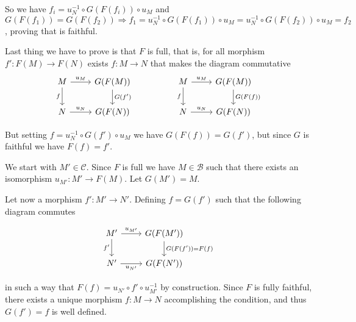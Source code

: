 \documentclass[leqno]{article}
\begin{document}
So we have $f_i = u_N^{-1}\circ G(F(f_i))\circ u_M$ and $G(F(f_1))=G(F(f_2))\Rightarrow f_1= u^{-1}_N\circ G(F(f_1))\circ u_M = u^{-1}_N\circ G(F(f_2))\circ u_M  = f_2$, proving that is faithful.

Last thing we have to prove is that $F$ is full, that is, for all morphism  $f':F(M)\to F(N)$ exists $f: M\to N$ that makes the diagram commutative
\[\begin{tikzcd}
	M & {G(F(M))} && M & {G(F(M))} \\
	N & {G(F(N))} && N & {G(F(N))}
	\arrow["{u_N}", from=2-1, to=2-2]
	\arrow["{u_M}", from=1-1, to=1-2]
	\arrow["f"', from=1-1, to=2-1]
	\arrow["{G(f')}", from=1-2, to=2-2]
	\arrow["f"', from=1-4, to=2-4]
	\arrow["{u_M}", from=1-4, to=1-5]
	\arrow["{u_N}", from=2-4, to=2-5]
	\arrow["{G(F(f))}", from=1-5, to=2-5]
\end{tikzcd}\]

But setting $f=u_N^{-1}\circ G(f')\circ u_M$ we have $G(F(f))=G(f')$, but since  $G$ is faithful we have  $F(f)=f'$.

\fbox{$\Leftarrow$} We start with $M'\in \mathcal{C}$. Since $F$ is full we have  $M\in \mathcal{B}$ such that there exists an isomorphism $u_{M'}: M'\to F(M)$. Let $G(M')=M$.

Let now a morphism $f':M'\to N'$. Defining $f=G(f')$ such that the following diagram commutes

\[\begin{tikzcd}
	{M'} & {G(F(M'))} \\
	{N'} & {G(F(N'))}
	\arrow["{f'}"', from=1-1, to=2-1]
	\arrow["{u_{M'}}", from=1-1, to=1-2]
	\arrow["{u_{N'}}"', from=2-1, to=2-2]
	\arrow["{G(F(f'))=F(f)}", from=1-2, to=2-2]
\end{tikzcd}\]

in such a way that $F(f)=u_{N'}\circ f'\circ u_{M'}^{-1}$ by construction. Since $F$ is fully faithful, there exists a unique morphism  $f:M\to N$ accomplishing the condition, and thus $G(f')=f$ is well defined.
\end{document}
